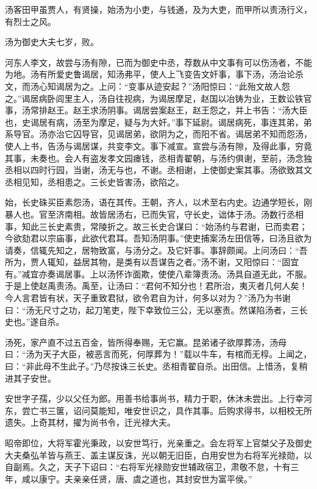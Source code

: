 \documentclass[12pt,UTF8]{ctexbook}
\begin{document}
汤客田甲虽贾人，有贤操，始汤为小吏，与钱通，及为大吏，而甲所以责汤行义，有烈士之风。



汤为御史大夫七岁，败。



河东人李文，故尝与汤有隙，已而为御史中丞，荐数从中文事有可以伤汤者，不能为地。汤有所爱史鲁谒居，知汤弗平，使人上飞变告文奸事，事下汤，汤治论杀文，而汤心知谒居为之。上问：“变事从迹安起？”汤阳惊曰：“此殆文故人怨之。”谒居病卧闾里主人，汤自往视病，为谒居摩足，赵国以冶铸为业，王数讼铁官事，汤常排赵王。赵王求汤阴事。谒居尝案赵王，赵王怨之，并上书告：“汤大臣也，史谒居有病，汤至为摩足，疑与为大奸。”事下延尉。谒居病死，事连其弟，弟系导官。汤亦治它囚导官，见谒居弟，欲阴为之，而阳不省。谒居弟不知而怨汤，使人上书，告汤与谒居谋，共变李文。事下减宣。宣尝与汤有隙，及得此事，穷竟其事，未奏也。会人有盗发孝文园瘗钱，丞相青翟朝，与汤约俱谢，至前，汤念独丞相以四时行园，当谢，汤无与也，不谢。丞相谢，上使御史案其事。汤欲致其文丞相见知，丞相患之。三长史皆害汤，欲陷之。



始，长史硃买臣素怨汤，语在其传。王朝，齐人，以术至右内史。边通学短长，刚暴人也。官至济南相。故皆居汤右，已而失官，守长史，诎体于汤。汤数行丞相事，知此三长史素贵，常陵折之。故三长史合谋曰：“始汤约与君谢，已而卖君；今欲劾君以宗庙事，此欲代君耳。吾知汤阴事。”使吏捕案汤左田信等，曰汤且欲为请奏，信辄先知之，居物致富，与汤分之。及它奸事。事辞颇闻。上问汤曰：“吾所为，贾人辄知，益居其物，是类有以吾谋告之者。”汤不谢，又阳惊曰：“固宜有。”减宜亦奏谒居事。上以汤怀诈面欺，使使八辈簿责汤。汤具自道无此，不服。于是上使赵禹责汤。禹至，让汤曰：“君何不知分也！君所治，夷灭者几何人矣！今人言君皆有状，天子重致君狱，欲令君自为计，何多以对为？”汤乃为书谢曰：“汤无尺寸之功，起刀笔吏，陛下幸致位三公，无以塞责。然谋陷汤者，三长史也。”遂自杀。



汤死，家产直不过五百金，皆所得奉赐，无它赢。昆弟诸子欲厚葬汤，汤母曰：“汤为天子大臣，被恶言而死，何厚葬为！”载以牛车，有棺而无椁。上闻之，曰：“非此母不生此子。”乃尽按诛三长史。丞相青翟自杀。出田信。上惜汤，复稍进其子安世。



安世字子孺，少以父任为郎。用善书给事尚书，精力于职，休沐未尝出。上行幸河东，尝亡书三箧，诏问莫能知，唯安世识之，具作其事。后购求得书，以相校无所遗失。上奇其材，擢为尚书令，迁光禄大夫。



昭帝即位，大将军霍光秉政，以安世笃行，光亲重之。会左将军上官桀父子及御史大夫桑弘羊皆与燕王、盖主谋反诛，光以朝无旧臣，白用安世为右将军光禄勋，以自副焉。久之，天子下诏曰：“右将军光禄勋安世辅政宿卫，肃敬不怠，十有三年，咸以康宁。夫亲亲任贤，唐、虞之道也，其封安世为富平侯。”
\end{document}
